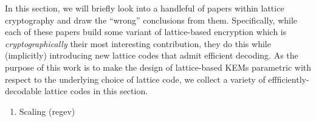 In this section, we will briefly look into a handleful of papers within lattice cryptography and draw the ``wrong'' conclusions from them.
Specifically, while each of these papers build some variant of lattice-based encryption which is \emph{cryptographically} their most interesting contribution, they do this while (implicitly) introducing new lattice codes that admit efficient decoding.
As the purpose of this work is to make the design of lattice-based KEMs parametric with respect to the underlying choice of lattice code, we collect a variety of effficiently-decodable lattice codes in this section.

\begin{enumerate}
	\item Scaling (regev)
	
\end{enumerate}